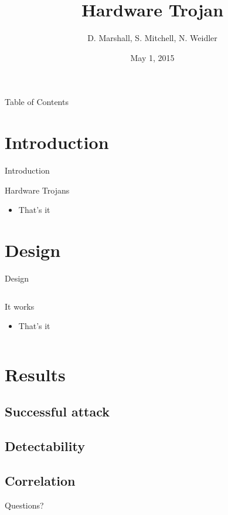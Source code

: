 
\setcounter{tocdepth}{2}
\title{Hardware Trojan }
\author{D. Marshall, S. Mitchell, N. Weidler}
\date{May 1, 2015}




\frame{\titlepage}
\begin{frame}{Table of Contents}
	\tableofcontents
\end{frame}

\section{Introduction}
	\begin{frame}{Introduction}
		\begin{block}{Hardware Trojans}
			\begin{itemize}
				\item That's it
			\end{itemize}
		\end{block}
	\end{frame}

\section{Design}
	\begin{frame}{Design}
		\begin{columns}[T]
		\begin{column}{0.5\textwidth}
		\begin{block}{It works}
			\begin{itemize}
				\item That's it
			\end{itemize}
		\end{block}
		\end{column}
		\begin{column}{0.5\textwidth}
		\end{column}
		\end{columns}
	\end{frame}

\section{Results}
\subsection{Successful attack}
\subsection{Detectability}
\subsection{Correlation}

\begin{frame}
    \Huge Questions?
\end{frame}


